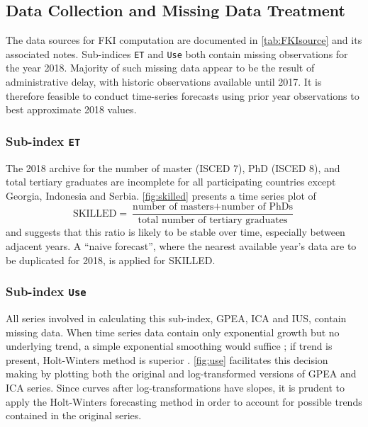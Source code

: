 \documentclass[a4paper,11pt,UKenglish,twoside,openright]{report}\usepackage[]{graphicx}\usepackage[]{color}
\begin{document}
\subsection{Data Collection and Missing Data Treatment}

The data sources for FKI computation are documented in \cref{tab:FKIsource} and its associated notes. Sub-indices \texttt{ET} and \texttt{Use} both contain missing observations for the year 2018. Majority of such missing data appear to be the result of administrative delay, with historic observations available until 2017. It is therefore feasible to conduct time-series forecasts using prior year observations to best approximate 2018 values.



\subsubsection{Sub-index \texttt{ET}}

The 2018 archive for the number of master (ISCED 7), PhD (ISCED 8), and total tertiary graduates are incomplete for all participating countries except Georgia, Indonesia and Serbia. \cref{fig:skilled} presents a time series plot of
%
\vspace{-3mm}
%
\[ \text{SKILLED} = \frac{\text{number of masters} + \text{number of PhDs}}{\text{total number of tertiary graduates}} \]
%
\vspace{-5mm}
%
%
and suggests that this ratio is likely to be stable over time, especially between adjacent years. A ``naive forecast'', where the nearest available year's data are to be duplicated for 2018, is applied for SKILLED.

\subsubsection{Sub-index \texttt{Use}}

All series involved in calculating this sub-index, GPEA, ICA and IUS, contain missing data. When time series data contain only exponential growth but no underlying trend, a simple exponential smoothing would suffice \parencite{garder:1985}; if trend is present, Holt-Winters method is superior \parencite{chatfield:1978}. \cref{fig:use} facilitates this decision making by plotting both the original and log-transformed versions of GPEA and ICA series. Since curves after log-transformations have slopes, it is prudent to apply the Holt-Winters forecasting method in order to account for possible trends contained in the original series.
\end{document}
